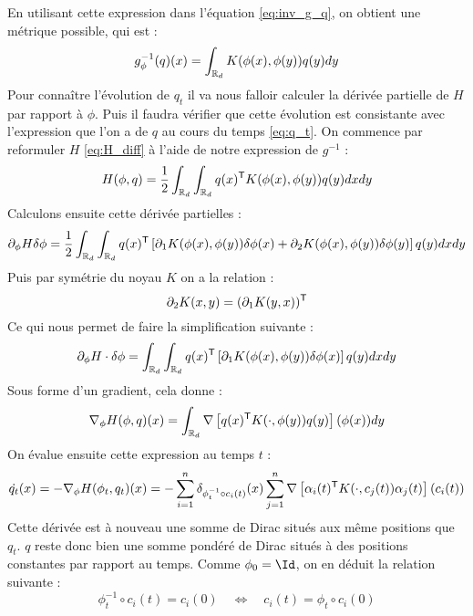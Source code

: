 En utilisant cette expression dans l'équation \eqref{eq:inv_g_q}, on obtient une métrique possible, qui est :
\begin{equation}
	g_\phi^{-1}(q)(x) = \int_{\mathbb{R}_d} K(\phi(x), \phi(y)) q(y) dy
\end{equation}
Pour connaître l'évolution de $q_t$ il va nous falloir calculer la dérivée partielle de $H$ par rapport à $\phi$. Puis il faudra vérifier que cette évolution est consistante avec l'expression que l'on a de $q$ au cours du temps \eqref{eq:q_t}. On commence par reformuler $H$ \eqref{eq:H_diff} à l'aide de notre expression de $g^{-1}$ :
\begin{equation}
	H(\phi, q) = \frac{1}{2} \int_{\mathbb{R}_d} \int_{\mathbb{R}_d} q(x)^{\mathsf{T}} K(\phi(x), \phi(y)) q(y) dx dy
\end{equation}
Calculons ensuite cette dérivée partielles :
\begin{equation}
	\partial_\phi H \delta \phi = \frac{1}{2} \int_{\mathbb{R}_d} \int_{\mathbb{R}_d} q(x)^{\mathsf{T}} \left[ \partial_1 K(\phi(x), \phi(y)) \delta \phi(x) + \partial_2 K(\phi(x), \phi(y)) \delta \phi(y) \right] q(y) dx dy
\end{equation}
Puis par symétrie du noyau $K$ on a la relation :
\begin{equation}
	\partial_2 K(x, y) = (\partial_1 K(y, x))^{\mathsf{T}}
\end{equation}
Ce qui nous permet de faire la simplification suivante :
\begin{equation}
	\partial_\phi H \cdot \delta \phi = \int_{\mathbb{R}_d} \int_{\mathbb{R}_d} q(x)^{\mathsf{T}} \left[ \partial_1 K(\phi(x), \phi(y)) \delta \phi(x) \right] q(y) dx dy
\end{equation}
Sous forme d'un gradient, cela donne :
\begin{equation}
	\nabla_\phi H(\phi, q)(x) = \int_{\mathbb{R}_d} \nabla \left[ q(x)^{\mathsf{T}} K(\cdot, \phi(y)) q(y) \right] (\phi(x)) dy
\end{equation}
On évalue ensuite cette expression au temps $t$ :
\begin{equation}
	\dot{q_t}(x) = - \nabla_\phi H(\phi_t, q_t) (x) = - \sum_{i=1}^n \delta_{\phi_t^{-1} \circ c_i(t)}(x) \sum_{j=1}^n \nabla \left[ \alpha_i(t)^{\mathsf{T}} K(\cdot, c_j(t)) \alpha_j(t) \right] (c_i(t))
\end{equation}
Cette dérivée est à nouveau une somme de Dirac situés aux même positions que $q_t$. $q$ reste donc bien une somme pondéré de Dirac situés à des positions constantes par rapport au temps. Comme $\phi_0 = \Id$, on en déduit la relation suivante :
\begin{equation}
	\label{eq:c_cons}
	\phi_t^{-1} \circ c_i(t) = c_i(0) \quad \Leftrightarrow \quad c_i(t) = \phi_t \circ c_i(0)
\end{equation}
